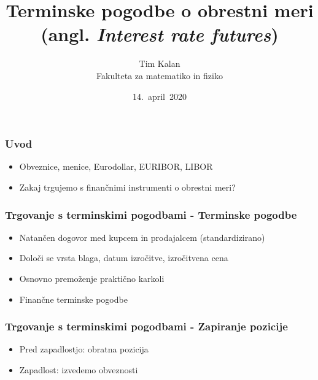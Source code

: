 \documentclass[14pt]{beamer}
\author{Tim Kalan \\ 
    Fakulteta za matematiko in fiziko}
\title{
    Terminske pogodbe o obrestni meri \\ 
    \large (angl. \textit{Interest rate futures})}
\date{14.\ april\ 2020}
\begin{document}
\begin{frame}
    \titlepage
\end{frame}


\begin{frame}
    \frametitle{Uvod}

    \begin{itemize}
        \item Obveznice, menice, Eurodollar, EURIBOR, LIBOR
        \item Zakaj trgujemo s finančnimi instrumenti o obrestni meri?
        
    \end{itemize}


\end{frame}




\begin{frame}
    \frametitle{Trgovanje s terminskimi pogodbami - Terminske pogodbe}
    
    \begin{itemize}
        \item Natančen dogovor med kupcem in prodajalcem (standardizirano)
        \item Določi se vrsta blaga, datum izročitve, izročitvena cena
        \item Osnovno premoženje praktično karkoli 
        \item Finančne terminske pogodbe
    \end{itemize}


\end{frame}


\begin{frame}
    \frametitle{Trgovanje s terminskimi pogodbami - Zapiranje pozicije}
    
    \begin{itemize}
        \item Pred zapadlostjo: obratna pozicija
        \item Zapadlost: izvedemo obveznosti
    \end{itemize}


\end{frame}
\end{document}
